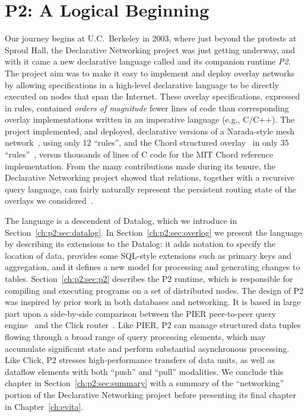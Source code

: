 \chapter[P2: A Logical Beginning]{P2: A Logical Beginning}
\label{ch:p2}

Our journey begins at U.C.~Berkeley in $2003$, where just beyond the protests
at Sproul Hall, the Declarative Networking project was just getting underway,
and with it came a new declarative language called {\em \OVERLOG} and its
companion runtime {\em P2}.  The project aim was to make it easy to implement
and deploy overlay networks by allowing specifications in a high-level
declarative language to be directly executed on nodes that span the Internet.
These overlay specifications, expressed in \OVERLOG rules, contained {\em
orders of magnitude} fewer lines of code than corresponding overlay
implementations written in an imperative language (e.g., C/C++).  The project
implemented, and deployed, declarative versions of a Narada-style mesh
network~\cite{chu00case}, using only 12 ``rules'', and the Chord structured
overlay~\cite{chord} in only 35 ``rules''~\cite{p2:sosp}, versus thousands of
lines of C code for the MIT Chord reference implementation.  From the many
contributions made during its tenure, the Declarative Networking project showed
that relations, together with a recursive query language, can fairly naturally
represent the persistent routing state of the overlays we
considered~\cite{boon-thesis}.

The \OVERLOG language is a descendent of Datalog, which we introduce in
Section~\ref{ch:p2:sec:datalog}.  In Section~\ref{ch:p2:sec:overlog} we present
the \OVERLOG language by describing its extensions to the Datalog: it adds
notation to specify the location of data, provides some SQL-style extensions
such as primary keys and aggregation, and it defines a new model for processing
and generating changes to tables.  Section~\ref{ch:p2:sec:p2} describes the P2
runtime, which is responsible for compiling and executing \OVERLOG programs on
a set of distributed nodes.  The design of P2 was inspired by prior work in
both databases and networking.  It is based in large part upon a side-by-side
comparison between the PIER peer-to-peer query engine~\cite{pier-cidr05} and
the Click router~\cite{click-tocs}.  Like PIER, P2 can manage structured data
tuples flowing through a broad range of query processing elements, which may
accumulate significant state and perform substantial asynchronous processing.
Like Click, P2 stresses high-performance transfers of data units, as well as
dataflow elements with both ``push'' and ``pull'' modalities.  We conclude this
chapter in Section~\ref{ch:p2:sec:summary} with a summary of the ``networking''
portion of the Declarative Networking project before presenting its final
chapter in Chapter~\ref{ch:evita}.

